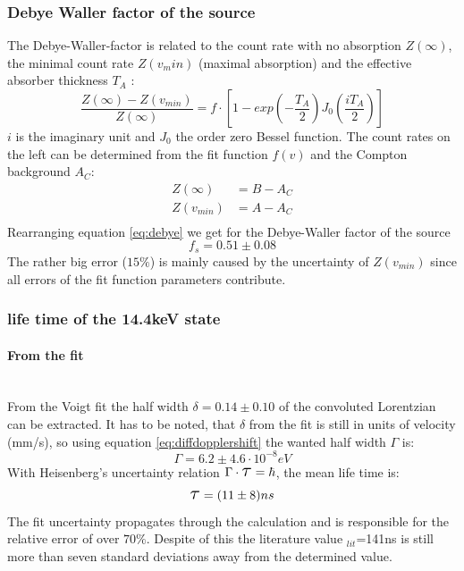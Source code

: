 \subsubsection{Debye Waller factor of the source}
The Debye-Waller-factor is related to the count rate with no absorption $Z(\infty)$, the minimal count rate $Z(v_min)$ (maximal absorption) and the effective absorber thickness $T_A$ \cite{Wegener}:
\begin{equation}
\frac{Z(\infty)-Z(v_{min})}{Z(\infty)}=f\cdot [1-exp(-\frac{T_A}{2})J_0(\frac{iT_A}{2})]
\label{eq:debye}
\end{equation}
$i$ is the imaginary unit and $J_0$ the order zero Bessel function. The count rates on the left can be determined from the fit function $f(v)$ and the Compton background $A_C$:
\begin{equation}
\begin{aligned}
Z(\infty) &= B - A_C\\
Z(v_{min}) &= A-A_C\\
\end{aligned}
\end{equation}
Rearranging equation \ref{eq:debye} we get for the Debye-Waller factor of the source
\begin{equation}
f_s= 0.51\pm0.08
\end{equation}
The rather big error ($15\%$) is mainly caused by the uncertainty of $Z(v_{min})$ since all errors of the fit function parameters contribute.

\subsubsection{life time of the 14.4keV state}
\paragraph{From the fit}\ \\
From the Voigt fit the half width $\delta = 0.14 \pm 0.10$ of the convoluted Lorentzian can be extracted. It has to be noted, that $\delta$ from the fit is still in units of velocity (mm/s), so using equation \ref{eq:diffdopplershift} the wanted half width $\Gamma$ is:
\begin{equation}
\Gamma  = 6.2\pm4.6\cdot 10^{-8} eV
\end{equation}
With Heisenberg's uncertainty relation $\Gamma \cdot \scalebox{1.5}{$\tau$}=\hbar$, the mean life time is:
\begin{equation}
\scalebox{1.5}{$\tau$}= (11\pm8)ns
\end{equation}
The fit uncertainty propagates through the calculation and is responsible for the 
relative error of over $70\%$. Despite of this the literature value \scalebox{1.5}{$\tau$}$_{lit}$=141ns is still more than seven standard deviations away from the determined value.

